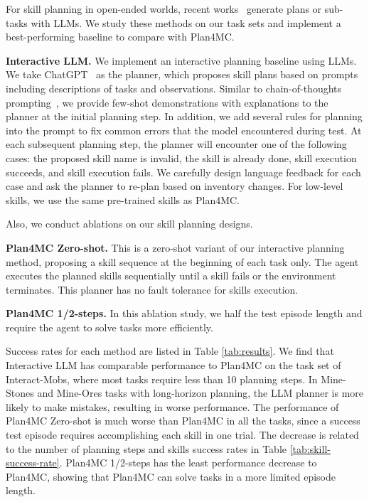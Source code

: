 \documentclass{article}
\begin{document}
For skill planning in open-ended worlds, recent works~\citep{translation-lm, inner-monologue, saycan, code-as-policy, deps} generate plans or sub-tasks with LLMs. We study these methods on our task sets and implement a best-performing baseline to compare with Plan4MC.

\textbf{Interactive LLM.} We implement an interactive planning baseline using LLMs. We take ChatGPT~\citep{gpt} as the planner, which proposes skill plans based on prompts including descriptions of tasks and observations. Similar to chain-of-thoughts prompting~\citep{chain-of-thoughts}, we provide few-shot demonstrations with explanations to the planner at the initial planning step. In addition, we add several rules for planning into the prompt to fix common errors that the model encountered during test. At each subsequent planning step, the planner will encounter one of the following cases: the proposed skill name is invalid, the skill is already done, skill execution succeeds, and skill execution fails. We carefully design language feedback for each case and ask the planner to re-plan based on inventory changes. For low-level skills, we use the same pre-trained skills as Plan4MC.

Also, we conduct ablations on our skill planning designs.

\textbf{Plan4MC Zero-shot.} This is a zero-shot variant of our interactive planning method, proposing a skill sequence at the beginning of each task only. The agent executes the planned skills sequentially until a skill fails or the environment terminates. This planner has no fault tolerance for skills execution.

\textbf{Plan4MC 1/2-steps.} In this ablation study, we half the test episode length and require the agent to solve tasks more efficiently.

Success rates for each method are listed in Table \ref{tab:results}. We find that Interactive LLM has comparable performance to Plan4MC on the task set of Interact-Mobs, where most tasks require less than 10 planning steps. In Mine-Stones and Mine-Ores tasks with long-horizon planning, the LLM planner is more likely to make mistakes, resulting in worse performance. The performance of Plan4MC Zero-shot is much worse than Plan4MC in all the tasks, since a success test episode requires accomplishing each skill in one trial. The decrease is related to the number of planning steps and skills success rates in Table \ref{tab:skill-success-rate}. Plan4MC 1/2-steps has the least performance decrease to Plan4MC, showing that Plan4MC can solve tasks in a more limited episode length.
\end{document}
